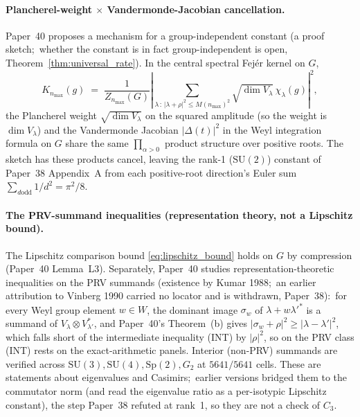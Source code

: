 \documentclass[11pt,a4paper]{article}
\theoremstyle{plain}
\theoremstyle{definition}
\newcommand{\nmax}{n_{\max}}
\newcommand{\SU}{\mathrm{SU}}
\begin{document}
\paragraph{Plancherel-weight $\times$ Vandermonde-Jacobian
cancellation.}
Paper~40 proposes a mechanism for a group-independent constant (a
proof sketch;\ whether the constant is in fact group-independent is
open, Theorem~\ref{thm:universal_rate}).  In the central spectral
Fej\'er kernel on $G$,
\begin{equation}
K_{\nmax}(g) \;=\; \frac{1}{Z_{\nmax}(G)}
\left|\sum_{\lambda \,:\, |\lambda + \rho|^{2} \le M(\nmax)^{2}}
\sqrt{\dim V_{\lambda}}\,\chi_{\lambda}(g)\right|^{2},
\label{eq:fejer_kernel_general}
\end{equation}
the Plancherel weight $\sqrt{\dim V_{\lambda}}$ on the squared
amplitude (so the weight is $\dim V_{\lambda}$) and the Vandermonde
Jacobian $|\Delta(t)|^{2}$ in the Weyl integration formula on $G$
share the same $\prod_{\alpha > 0}$ product structure over positive
roots.  The sketch has these products cancel, leaving the rank-1
($\SU(2)$) constant of Paper~38 Appendix~A from each positive-root
direction's Euler sum $\sum_{d \mathrm{ odd}} 1/d^{2} = \pi^{2}/8$.

\paragraph{The PRV-summand inequalities (representation theory, not a
Lipschitz bound).}
The Lipschitz comparison bound \eqref{eq:lipschitz_bound} holds on $G$
by compression (Paper~40 Lemma~L3).  Separately, Paper~40 studies
representation-theoretic inequalities on the PRV summands (existence by
Kumar 1988;\ an earlier attribution to Vinberg 1990 carried no locator
and is withdrawn, Paper~38):\ for
every Weyl group element $w \in W$, the dominant image
$\sigma_{w}$ of $\lambda + w\lambda'^{*}$ is a summand of
$V_{\lambda} \otimes V_{\lambda'}^{*}$, and Paper~40's Theorem~(b) gives
$|\sigma_{w} + \rho|^{2} \ge |\lambda - \lambda'|^{2}$, which falls short
of the intermediate inequality (INT) by $|\rho|^{2}$, so on the PRV class
(INT) rests on the exact-arithmetic panels.  Interior (non-PRV)
summands are verified across $\SU(3), \SU(4), \mathrm{Sp}(2), G_{2}$ at
$5641/5641$ cells.  These are statements about eigenvalues and
Casimirs;\ earlier versions bridged them to the commutator norm (and
read the eigenvalue ratio as a per-isotypic Lipschitz constant), the
step Paper~38 refuted at rank~1, so they are not a check of $C_{3}$.
\end{document}
